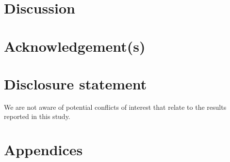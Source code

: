 \documentclass[]{interact}
\begin{document}
\section{Discussion}



\section*{Acknowledgement(s)}


\section*{Disclosure statement}

We are not aware of potential conflicts of interest that relate to the results reported in this study.



\newpage





\newpage
\section{Appendices}

\appendix
\end{document}
